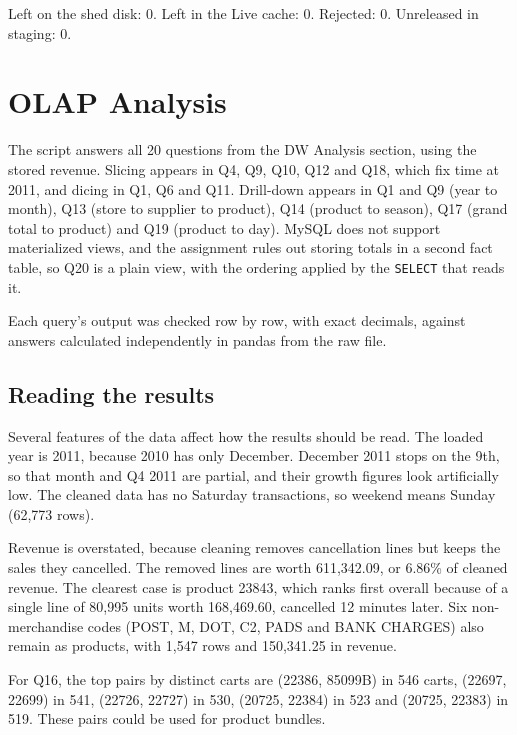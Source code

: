 \documentclass[11pt,a4paper]{article}
\newcommand{\code}[1]{\texttt{\detokenize{#1}}}
\begin{document}
Left on the shed disk: 0. Left in the Live cache: 0. Rejected: 0. Unreleased in staging: 0.

\section{OLAP Analysis}
\label{sec:olap}

The script \code{Queries-DW/queries_dw.sql} answers all 20 questions from the DW Analysis section, using the stored revenue. Slicing appears in Q4, Q9, Q10, Q12 and Q18, which fix time at 2011, and dicing in Q1, Q6 and Q11. Drill-down appears in Q1 and Q9 (year to month), Q13 (store to supplier to product), Q14 (product to season), Q17 (grand total to product) and Q19 (product to day). MySQL does not support materialized views, and the assignment rules out storing totals in a second fact table, so Q20 is a plain view, with the ordering applied by the \texttt{SELECT} that reads it.

Each query's output was checked row by row, with exact decimals, against answers calculated independently in pandas from the raw file.

\subsection{Reading the results}

Several features of the data affect how the results should be read. The loaded year is 2011, because 2010 has only December. December 2011 stops on the 9th, so that month and Q4 2011 are partial, and their growth figures look artificially low. The cleaned data has no Saturday transactions, so weekend means Sunday (62,773 rows).

Revenue is overstated, because cleaning removes cancellation lines but keeps the sales they cancelled. The removed lines are worth 611,342.09, or 6.86\% of cleaned revenue. The clearest case is product 23843, which ranks first overall because of a single line of 80,995 units worth 168,469.60, cancelled 12 minutes later. Six non-merchandise codes (POST, M, DOT, C2, PADS and BANK CHARGES) also remain as products, with 1,547 rows and 150,341.25 in revenue.

For Q16, the top pairs by distinct carts are (22386, 85099B) in 546 carts, (22697, 22699) in 541, (22726, 22727) in 530, (20725, 22384) in 523 and (20725, 22383) in 519. These pairs could be used for product bundles.
\end{document}
